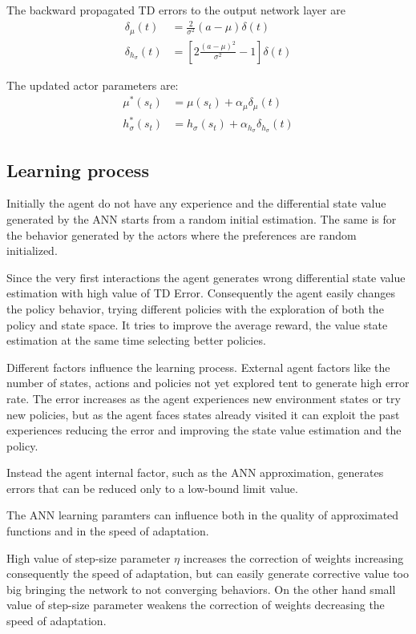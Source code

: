 \documentclass[]{article}
\begin{document}
The backward propagated TD errors to the output network layer are
\begin{align}
\delta_\mu(t)&		= \frac{2}{\sigma^2}(a - \mu) \delta (t)
\\
\delta_{h_\sigma}(t)&	= \left[
2\frac{(a - \mu)^2}{\sigma^2} - 1
\right] \delta(t)
\end{align}

The updated actor parameters are:
\begin{align}
\mu^*(s_t)&			= \mu(s_t) + \alpha_\mu \delta_\mu(t)
\\
h^*_\sigma(s_t)&	= h_\sigma(s_t) + \alpha_{h_\sigma} \delta_{h_\sigma}(t)
\end{align}

\subsection{Learning process}

Initially the agent do not have any experience and the differential state value generated by the ANN starts from a random initial estimation. The same is for the behavior generated by the actors where the preferences are random initialized.

Since the very first interactions the agent generates wrong differential state value estimation with high value of TD Error. Consequently the agent easily changes the policy behavior, trying different policies with the exploration of both the policy and state space. It tries to improve the average reward, the value state estimation at the same time selecting better policies.

Different factors influence the learning process.
External agent factors like the number of states, actions and policies not yet explored tent to generate high error rate.
The error increases as the agent experiences new environment states or try new policies, but as the agent faces states already visited it can exploit the past experiences reducing the error and improving the state value estimation and the policy.

Instead the agent internal factor, such as the ANN approximation, generates errors that can be reduced only to a low-bound limit value.

The ANN learning paramters can influence both in the quality of approximated functions and in the  speed of adaptation.

High value of step-size parameter $ \eta $ increases the correction of weights increasing consequently the speed of adaptation, but can easily generate corrective value too big bringing the network to not converging behaviors.
On the other hand small value of step-size parameter weakens the correction of weights decreasing the speed of adaptation.
\end{document}
